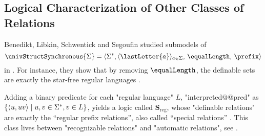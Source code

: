 \subsection{Logical Characterization of Other Classes of Relations}

Benedikt, Libkin, Schwentick and Segoufin studied submodels of
\[\univStructSynchronous{\Sigma} =
\tup{\Sigma^*, \langle\lastLetter{a}\rangle_{a \in \Sigma},\, \equalLength,\, \prefix}\]
in \cite{BenediktLibkinSchwentickSegoufin2003DefinableRelations}.
For instance, they show that by removing $\equalLength$, the definable sets are exactly
the star-free regular languages
\cite[Corollary 3.7]{BenediktLibkinSchwentickSegoufin2003DefinableRelations}.

Adding a binary predicate for each "regular language" $L$, "interpreted@@pred"
as $\{\langle u,uv\rangle \mid u,v \in \Sigma^*, v \in L \}$, yields
a logic called $\symbf{S}_{\mathrm{reg}}$, whose "definable relations"
are exactly the ``regular prefix relations'', also called ``special relations''
\cite[Corollary 3.22]{BenediktLibkinSchwentickSegoufin2003DefinableRelations}.
This class lives between "recognizable relations" and "automatic relations",
see \cite[\S~``1984'']{Choffrut2006Survey}.
